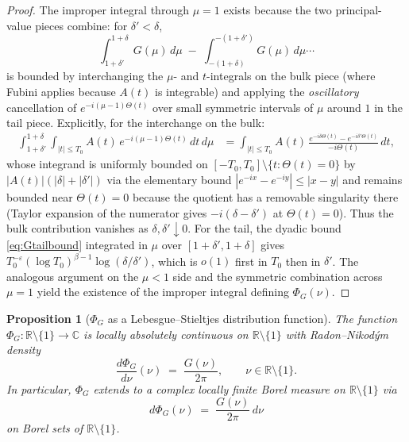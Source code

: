 \documentclass[11pt]{article}
\newtheorem{proposition}[theorem]{Proposition}
\begin{document}
\begin{proof}
The improper integral through $\mu=1$ exists because the two principal-value pieces combine: for $\delta'<\delta$,
\[
\int_{1+\delta'}^{1+\delta}G(\mu)\,d\mu \;-\; \int_{-(1+\delta)}^{-(1+\delta')}G(\mu)\,d\mu  \cdots
\]
is bounded by interchanging the $\mu$- and $t$-integrals on the bulk piece (where Fubini applies because $A(t)$ is integrable) and applying the \emph{oscillatory} cancellation of $e^{-i(\mu-1)\Theta(t)}$ over small symmetric intervals of $\mu$ around $1$ in the tail piece. Explicitly, for the interchange on the bulk:
\begin{align}
\int_{1+\delta'}^{1+\delta}\!\int_{|t|\le T_0} A(t)\,e^{-i(\mu-1)\Theta(t)}\,dt\,d\mu
&= \int_{|t|\le T_0} A(t)\,\frac{e^{-i\delta\Theta(t)}-e^{-i\delta'\Theta(t)}}{-i\Theta(t)}\,dt, \label{eq:innerIBP}
\end{align}
whose integrand is uniformly bounded on $[-T_0,T_0]\setminus\{t:\Theta(t)=0\}$ by $|A(t)|(|\delta|+|\delta'|)$ via the elementary bound $|e^{-ix}-e^{-iy}|\le|x-y|$ and remains bounded near $\Theta(t)=0$ because the quotient has a removable singularity there (Taylor expansion of the numerator gives $-i(\delta-\delta')$ at $\Theta(t)=0$). Thus the bulk contribution vanishes as $\delta,\delta'\downarrow 0$. For the tail, the dyadic bound \eqref{eq:Gtailbound} integrated in $\mu$ over $[1+\delta',1+\delta]$ gives $T_0^{-\varepsilon}(\log T_0)^{\beta-1}\log(\delta/\delta')$, which is $o(1)$ first in $T_0$ then in $\delta'$. The analogous argument on the $\mu<1$ side and the symmetric combination across $\mu=1$ yield the existence of the improper integral defining $\Phi_G(\nu)$.
\end{proof}

\begin{proposition}[$\Phi_G$ as a Lebesgue--Stieltjes distribution function]\label{prop:Phi-LS}
The function $\Phi_G:\mathbb R\setminus\{1\}\to\mathbb C$ is locally absolutely continuous on $\mathbb R\setminus\{1\}$ with Radon--Nikod\'ym density
\begin{equation}\label{eq:dPhi-density}
\frac{d\Phi_G}{d\nu}(\nu) \;=\; \frac{G(\nu)}{2\pi},\qquad \nu\in\mathbb R\setminus\{1\}.
\end{equation}
In particular, $\Phi_G$ extends to a complex locally finite Borel measure on $\mathbb R\setminus\{1\}$ via
\begin{equation}\label{eq:dPhi-measure}
d\Phi_G(\nu) \;=\; \frac{G(\nu)}{2\pi}\,d\nu
\end{equation}
on Borel sets of $\mathbb R\setminus\{1\}$.
\end{proposition}
\end{document}
